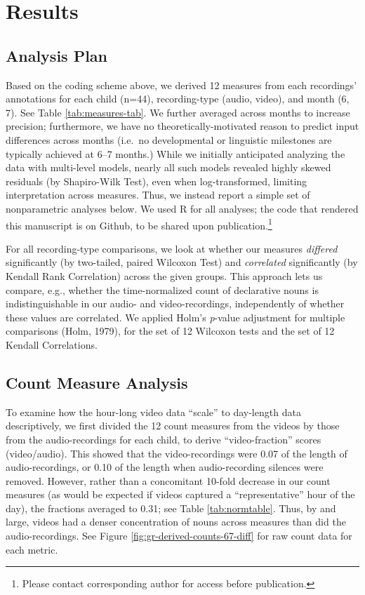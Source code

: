 \documentclass[man]{apa6}
\theoremstyle{definition}
\theoremstyle{definition}
\theoremstyle{definition}
\theoremstyle{remark}
\begin{document}
\section{Results}\label{results}

\subsection{Analysis Plan}\label{analysis-plan}

Based on the coding scheme above, we derived 12 measures from each
recordings' annotations for each child (n=44), recording-type (audio,
video), and month (6, 7). See Table \ref{tab:measures-tab}. We further
averaged across months to increase precision; furthermore, we have no
theoretically-motivated reason to predict input differences across
months (i.e.~no developmental or linguistic milestones are typically
achieved at 6--7 months.) While we initially anticipated analyzing the
data with multi-level models, nearly all such models revealed highly
skewed residuals (by Shapiro-Wilk Test), even when log-transformed,
limiting interpretation across measures. Thus, we instead report a
simple set of nonparametric analyses below. We used R for all analyses;
the code that rendered this manuscript is on Github, to be shared upon
publication.\footnote{Please contact corresponding author for access before publication.}

For all recording-type comparisons, we look at whether our measures
\emph{differed} significantly (by two-tailed, paired Wilcoxon Test) and
\emph{correlated} significantly (by Kendall Rank Correlation) across the
given groups. This approach lets us compare, e.g., whether the
time-normalized count of declarative nouns is indistinguishable in our
audio- and video-recordings, independently of whether these values are
correlated. We applied Holm's \emph{p}-value adjustment for multiple
comparisons (Holm, 1979), for the set of 12 Wilcoxon tests and the set
of 12 Kendall Correlations.

\subsection{Count Measure Analysis}\label{count-measure-analysis}

To examine how the hour-long video data \enquote{scale} to day-length
data descriptively, we first divided the 12 count measures from the
videos by those from the audio-recordings for each child, to derive
\enquote{video-fraction} scores (video/audio). This showed that the
video-recordings were 0.07 of the length of audio-recordings, or 0.10 of
the length when audio-recording silences were removed. However, rather
than a concomitant 10-fold decrease in our count measures (as would be
expected if videos captured a \enquote{representative} hour of the day),
the fractions averaged to 0.31; see Table \ref{tab:normtable}. Thus, by
and large, videos had a denser concentration of nouns across measures
than did the audio-recordings. See Figure
\ref{fig:gr-derived-counts-67-diff} for raw count data for each metric.
\end{document}
